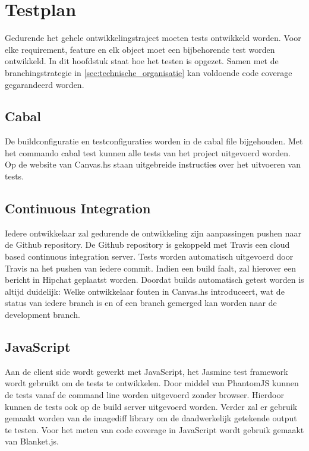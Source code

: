 \chapter{Testplan} \label{hoofdstuk:testplan}
Gedurende het gehele ontwikkelingstraject moeten tests ontwikkeld worden. Voor elke requirement, feature en elk object moet een bijbehorende test worden ontwikkeld. In dit hoofdstuk staat hoe het testen is opgezet. Samen met de branchingstrategie in \autoref{sec:technische_organisatie} kan voldoende code coverage gegarandeerd worden.

\section{Cabal}
De buildconfiguratie en testconfiguraties worden in de cabal file bijgehouden. Met het commando cabal test kunnen alle tests van het project uitgevoerd worden. Op de website van Canvas.hs staan uitgebreide instructies over het uitvoeren van tests.

\section{Continuous Integration}
Iedere ontwikkelaar zal gedurende de ontwikkeling zijn aanpassingen pushen naar de Github repository. De Github repository is gekoppeld met Travis een cloud based continuous integration server. Tests worden automatisch uitgevoerd door Travis na het pushen van iedere commit. Indien een build faalt, zal hierover een bericht in Hipchat geplaatst worden. Doordat builds automatisch getest worden is altijd duidelijk: Welke ontwikkelaar fouten in Canvas.hs introduceert, wat de status van iedere branch is en of een branch gemerged kan worden naar de development branch.

\section{JavaScript} 
Aan de client side wordt gewerkt met JavaScript, het Jasmine test framework wordt gebruikt om de tests te ontwikkelen. Door middel van PhantomJS kunnen de tests vanaf de command line worden uitgevoerd zonder browser. Hierdoor kunnen de tests ook op de build server uitgevoerd worden. Verder zal er gebruik gemaakt worden van de imagediff library om de daadwerkelijk getekende output te testen. Voor het meten van code coverage in JavaScript wordt gebruik gemaakt van Blanket.js.

